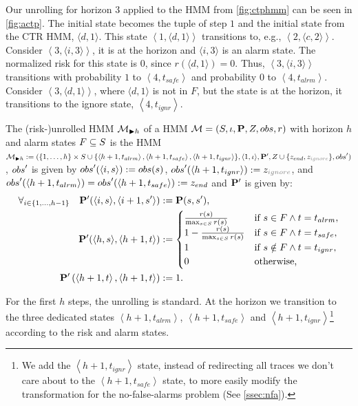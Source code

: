 \documentclass[runningheads]{llncs}
\newcommand{\Obs}{Z}
\newcommand{\actps}[3]{\left\langle #1, \langle #2, #3\rangle \right\rangle}
\newcommand{\talrm}{t_{alrm}}
\newcommand{\tsafe}{t_{safe}}
\newcommand{\tig}{t_{ignr}}
\newcommand{\ig}{z_{\color{gray} ignore}\xspace}
\newcommand{\en}{z_{\color{black} end}\xspace}
\newcommand{\alarms}[1][h+1]{\left\langle #1, \talrm\right\rangle}
\newcommand{\safes}[1][h+1]{\left\langle #1, \tsafe\right\rangle}
\newcommand{\igs}[1][h+1]{\left\langle #1, \tig\right\rangle}
\newcommand{\defeq}{:=}
\begin{document}
\begin{example}
    \label{ex:actp}
    Our unrolling for horizon $3$ applied to the HMM from \cref{fig:ctphmm} can be seen in \cref{fig:actp}. The initial state becomes the tuple of step $1$ and the initial state from the CTR HMM, $\langle d, 1\rangle$. This state $\actps{1}{d}{1}$ transitions to, e.g., $\actps{2}{c}{2}$.
    Consider $\actps{3}{i}{3}$, it is at the horizon and $\langle i, 3\rangle$ is an alarm state.
    The normalized risk for this state is $0$, since $r(\langle d, 1\rangle) = 0$. Thus, $\actps{3}{i}{3}$ transitions with probability $1$ to $\safes[4]$ and probability $0$ to  $\alarms[4]$. Consider $\actps{3}{d}{1}$, where $\langle d, 1\rangle$ is not in $F$, but the state is at the horizon, it transitions to the ignore state, $\igs[4]$.
\end{example}

\begin{definition}
    \label{def:acyclichmm}
    The (risk-)unrolled HMM $\mathcal{M}_{\blacktriangleright h}$ of a HMM $\mc = \left(\Sts, \init, \ptrans, \Obs, \obsf, r \right)$ with horizon $h$ and alarm states $F \subseteq S$ is the HMM $\mc_{\blacktriangleright h} \defeq (\{1,\hdots,h\} \times \Sts \cup \{ \alarms, \safes, \igs \}, \langle 1,\init\rangle, \ptrans', \Obs \cup \{\en, \ig\}, \obsf')$,
    ${obs}'$ is given by $\obsf'(\langle i, s\rangle) \defeq \obsf(s)$, $\obsf'(\igs) \defeq \ig$, and $\obsf'(\alarms) = \obsf'(\safes) \defeq \en$
    and $\mathbf{P}'$ is given by:
    \begin{align*}
        \forall_{i\in\{1,\ldots,h-1\}}\quad \ptrans'(\langle i, s\rangle, \langle i+1, s'\rangle) & \defeq \ptrans(s,s'), \\
        \ptrans'(\langle h, s\rangle,\left\langle h+1, t\right\rangle)                            & \defeq
        \begin{cases}
            \frac{r(s)}{\max_{s\in\Sts} r(s)}     & \text{if } s \in F \land t = \talrm,  \\
            1 - \frac{r(s)}{\max_{s\in\Sts} r(s)} & \text{if } s \in F \land t = \tsafe,  \\
            1                                     & \text{if } s \notin F \land t = \tig, \\
            0                                     & \text{otherwise,}
        \end{cases}                             \\
        \ptrans'\left(\left\langle h+1, t\right\rangle, \left\langle h+1, t\right\rangle\right)   & \defeq 1.
    \end{align*}
\end{definition}
For the first $h$ steps, the unrolling is standard. At the horizon we transition to the three dedicated states $\alarms$, $\safes$ and $\igs$\footnote{We add the $\igs$ state, instead of redirecting all traces we don't care about to the $\safes$ state, to more easily modify the transformation for the no-false-alarms problem (See \cref{ssec:nfa}).} according to the risk and alarm states.
\end{document}
